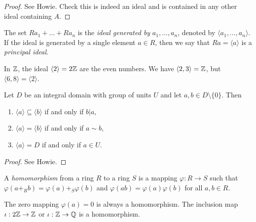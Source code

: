\begin{proof}
  See Howie. Check this is indeed an ideal
  and is contained in any other ideal containing $A$.
\end{proof}

\begin{definition}
  The set $Ra_1 + \dots + Ra_n$ is the
  \emph{ideal generated by} $a_1, \dots, a_n$,
  denoted by $\langle a_1, \dots, a_n \rangle$.
  If the ideal is generated by a single element
  $a \in R$, then we say that $Ra = \langle a \rangle$
  is a \emph{principal ideal}.
\end{definition}

\begin{example}
  In $\mathbb{Z}$, the ideal $\langle 2 \rangle = 2\mathbb{Z}$ are
  the even numbers. We have
  $\langle 2, 3 \rangle = \mathbb{Z}$, but
  $\langle 6, 8 \rangle = \langle 2 \rangle$.
\end{example}

\begin{tcolorbox}
\begin{theorem}
  Let $D$ be an integral domain with group of units
  $U$ and let $a, b \in D \setminus \{0\}$. Then
  \begin{enumerate}
    \item $\langle a \rangle \subseteq \langle b \rangle$
      if and only if $b | a$,
    \item $\langle a \rangle = \langle b \rangle$
      if and only if $a \sim b$,
    \item $\langle a \rangle = D$ if and only if
      $a \in U$.
  \end{enumerate}
\end{theorem}
\end{tcolorbox}

\begin{proof}
  See Howie.
\end{proof}

\begin{definition}
  A \emph{homomorphism} from a ring $R$ to a ring $S$
  is a mapping $\varphi : R \to S$ such that
  $\varphi(a +_R b) = \varphi(a) +_S \varphi(b)$ and
  $\varphi(ab) = \varphi(a)\varphi(b)$ for all
  $a, b \in R$.
\end{definition}

\begin{example}
  The zero mapping $\varphi(a) = 0$ is always a
  homomorphism. The inclusion map
  $\iota : 2\mathbb{Z} \to \mathbb{Z}$ or $\iota : \mathbb{Z} \to \mathbb{Q}$ is
  a homomorphism.
\end{example}

